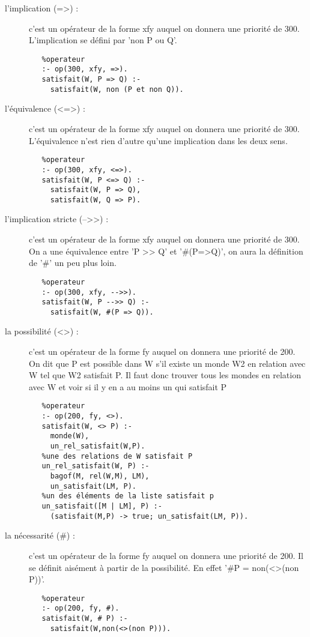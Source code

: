 \documentclass[a4paper,10pt]{article}
\begin{document}
\begin{description}
    \item[l'implication (=>) :] c'est un op\'{e}rateur de la forme xfy auquel on donnera une priorit\'{e} de 300. L'implication se d\'{e}fini par 'non P ou Q'.
    
       \begin{lstlisting}
   %operateur
   :- op(300, xfy, =>).
   satisfait(W, P => Q) :-
     satisfait(W, non (P et non Q)).
       \end{lstlisting}
       
    \item[l'\'{e}quivalence (<=>) :] c'est un op\'{e}rateur de la forme xfy auquel on donnera une priorit\'{e} de 300. L'\'{e}quivalence n'est rien d'autre qu'une implication dans
    les deux sens.
    
       \begin{lstlisting}
   %operateur
   :- op(300, xfy, <=>).
   satisfait(W, P <=> Q) :-
     satisfait(W, P => Q),
     satisfait(W, Q => P).
       \end{lstlisting}
       
    \item[l'implication stricte (-->>) :] c'est un op\'{e}rateur de la forme xfy auquel on donnera une priorit\'{e} de 300. On a une \'{e}quivalence entre
    'P \-\->> Q' et '\#(P=>Q)', on aura la d\'{e}finition de '\#' un peu plus loin.
    
       \begin{lstlisting}
   %operateur
   :- op(300, xfy, -->>).
   satisfait(W, P -->> Q) :-
     satisfait(W, #(P => Q)).
       \end{lstlisting}
       
    \item[la possibilit\'{e} (<>) :] c'est un op\'{e}rateur de la forme fy auquel on donnera une priorit\'{e} de 200. On dit que P est possible dans W s'il existe
    un monde W2 en relation avec W tel que W2 satisfait P. Il faut donc trouver tous les mondes en relation avec W et voir si il y en a au moins un qui satisfait P
       
       \begin{lstlisting}
   %operateur
   :- op(200, fy, <>).
   satisfait(W, <> P) :-
     monde(W),
     un_rel_satisfait(W,P).
   %une des relations de W satisfait P
   un_rel_satisfait(W, P) :-
     bagof(M, rel(W,M), LM),
     un_satisfait(LM, P).
   %un des éléments de la liste satisfait p
   un_satisfait([M | LM], P) :-
     (satisfait(M,P) -> true; un_satisfait(LM, P)).
       \end{lstlisting}
       
    \item[la n\'{e}cessarit\'{e} (\#) :] c'est un op\'{e}rateur de la forme fy auquel on donnera une priorit\'{e} de 200. Il se d\'{e}finit ais\'{e}ment \`{a} partir
    de la possibilit\'{e}. En effet '\#P = non(<>(non P))'.
    
       \begin{lstlisting}
   %operateur
   :- op(200, fy, #).
   satisfait(W, # P) :-
     satisfait(W,non(<>(non P))).
       \end{lstlisting}
   \end{description}
   
\end{document}
